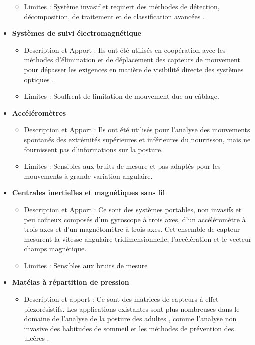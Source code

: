 \documentclass[8pt]{article}
\begin{document}
\begin{itemize}
\begin{itemize}[label={\textbullet}, leftmargin=*]
        \item Limites : Système invasif et requiert des méthodes de détection,
        décomposition, de traitement et de classification avancées \cite{raez_techniques_2006}.
    \end{itemize}
    \item \textbf{Systèmes de suivi électromagnétique}
    \begin{itemize}[label={\textbullet}, leftmargin=*]
        \item Description et Apport : Ils ont été utilisés en coopération avec les méthodes d'élimination et de déplacement des capteurs de mouvement \cite{karch_quantification_2008} pour dépasser les exigences en matière de visibilité directe des systèmes optiques \cite{karch_compensation_2010}.
        \item Limites : Souffrent de limitation de mouvement due au câblage.
    \end{itemize}
    \item \textbf{Accéléromètres}
    \begin{itemize}[label={\textbullet}, leftmargin=*]
        \item Description et Apport :  Ils ont été utilisés pour l'analyse des mouvements spontanés \cite{ohgi_time_2008} des extrémités supérieures \cite{gima_dynamical_2011} et inférieures du nourrisson, mais ne fournissent pas d'informations sur la posture.
        \item Limites : Sensibles aux bruits de mesure et pas adaptés pour les mouvements à grande variation angulaire.
    \end{itemize}
    \item \textbf{Centrales inertielles et magnétiques sans fil}
    \begin{itemize}[label={\textbullet}, leftmargin=*]
        \item Description et Apport : Ce sont des systèmes portables, non invasifs
            et peu coûteux composés d’un gyroscope à trois axes, d’un accéléromètre à trois axes
            et d’un magnétomètre à trois axes. Cet ensemble de capteur mesurent la vitesse angulaire tridimensionnelle, l’accélération et le vecteur champs magnétique.
        \item Limites : Sensibles aux bruits de mesure
    \end{itemize}
    \item \textbf{Matélas à répartition de pression}
    \begin{itemize}[label={\textbullet}, leftmargin=*]
        \item Description et apport : Ce sont des matrices de capteurs à effet piezorésistifs. Les applications existantes sont plus nombreuses dans le domaine de l’analyse de la posture des adultes , comme l’analyse non invasive des habitudes de sommeil \cite{ni_towards_2010,metsis_non-invasive_2014} et les méthodes de prévention des ulcères \cite{yousefi_bed_2011}.

\end{itemize}
\end{itemize}
\end{document}
